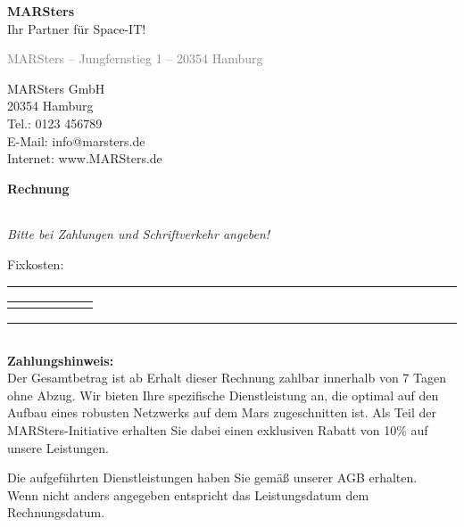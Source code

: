 \documentclass[12pt,a4paper]{article}
\begin{document}
\noindent
\raggedleft
\Huge\textbf{MARSters} \\[0.3em]
\large Ihr Partner für Space-IT! \\
\vspace{2em}
\begin{minipage}[t]{0.5\textwidth}
{\small \textcolor{gray}{MARSters – Jungfernstieg 1 – 20354 Hamburg}} \\[1em]

\end{minipage}
\hfill
\begin{minipage}[t]{0.45\textwidth}
\raggedleft
\vspace{1em}
MARSters GmbH \\
20354 Hamburg \\
Tel.: 0123 456789 \\
E-Mail: info@marsters.de \\
Internet: www.MARSters.de
\end{minipage}

\vspace{1.8em}

\textbf{\LARGE Rechnung}

\vspace{1em}
\begin{tabularx}{\textwidth}{@{}l X r@{}}

\end{tabularx}

\small\textit{Bitte bei Zahlungen und Schriftverkehr angeben!}

\vspace{1em}
Fixkosten:
\rule{\textwidth}{0.5pt}

\renewcommand{\arraystretch}{1.4}
\begin{tabularx}{\textwidth}{|c|X|c|r|c|r|}
\hline
\rowcolor{gray!30}


\end{tabularx}
\vspace{8.5em}
\rule{\textwidth}{0.5pt}
\renewcommand{\arraystretch}{1.4}



\noindent
\begin{minipage}[t]{0.48\textwidth}
\renewcommand{\arraystretch}{1.3}
\begin{tabularx}{\linewidth}{@{}X r@{}}

\end{tabularx}
\end{minipage}
\begin{minipage}[t]{\textwidth}
\small
\textbf{Zahlungshinweis:} \\
Der Gesamtbetrag ist ab Erhalt dieser Rechnung
zahlbar innerhalb von 7 Tagen ohne Abzug.
Wir bieten Ihre spezifische Dienstleistung an, die optimal auf den Aufbau eines robusten Netzwerks auf dem Mars zugeschnitten ist. 
Als Teil der MARSters-Initiative erhalten Sie dabei einen exklusiven Rabatt von 10\% auf unsere Leistungen.
\end{minipage}
\hfill


\vspace{1.5em}
\footnotesize
Die aufgeführten Dienstleistungen haben Sie gemäß unserer AGB erhalten.\\
Wenn nicht anders angegeben entspricht das Leistungsdatum dem Rechnungsdatum.
\end{document}
